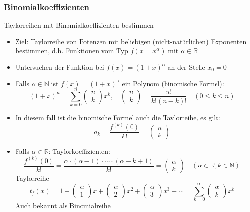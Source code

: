 \subsubsection{Binomialkoeffizienten}
\begin{KR}{Taylorreihen mit Binomialkoeffizienten bestimmen}
  \begin{itemize}
    \item Ziel: Taylorreihe von Potenzen mit beliebigen (nicht-natürlichen) Exponenten bestimmen, d.h. Funktionen vom
      Typ \(f(x=x^{\alpha})\) mit \(\alpha \in \mathbb{R}\)
    \item Untersuchen der Funktion bei \(f(x)=(1+x)^{\alpha}\) an der Stelle \(x_0=0\)
    \item Falls \(\alpha\in\mathbb{N}\) ist \(f(x)=(1+x)^{\alpha}\) ein Polynom (binomische Formel):
      \[(1+x)^n=\sum_{k=0}^n{\begin{pmatrix}n\\k\end{pmatrix}x^k},\quad
      \begin{pmatrix}n\\k\end{pmatrix}=\frac{n!}{k!(n-k)!}\quad (0\le k \le n)\]
    \item In diesem fall ist die binomische Formel auch die Taylorreihe, es gilt:
      \[a_k=\frac{f^{(k)}(0)}{k!}=\begin{pmatrix}n\\k\end{pmatrix}\]
    \item Falls \(\alpha\in\mathbb{R}\):
    \subitem Taylorkoeffizienten:
    \[\frac{f^{(k)}(0)}{k!}=\frac{\alpha\cdot(\alpha -1)\cdot\cdots\cdot(\alpha-k+1)}{k!}= 
      \begin{pmatrix}\alpha\\k\end{pmatrix}\quad (\alpha\in\mathbb{R},k\in\mathbb{N})\]
    \subitem Taylorreihe:
    \[t_f(x)=1+\begin{pmatrix}\alpha\\1\end{pmatrix}x+\begin{pmatrix}\alpha\\2\end{pmatrix}x^2+
    \begin{pmatrix}\alpha\\3\end{pmatrix}x^3+\cdots =\sum_{k=0}^{\infty}{\begin{pmatrix}\alpha\\k\end{pmatrix}x^k}\]
    Auch bekannt als Binomialreihe
  \end{itemize}
\end{KR}

